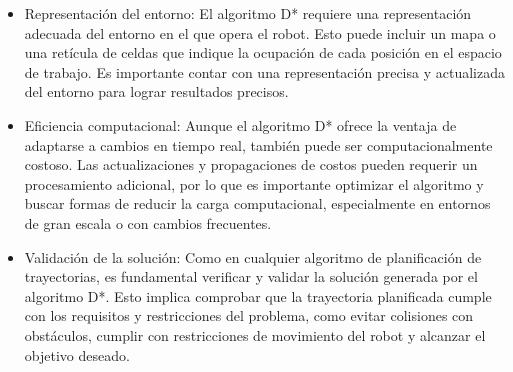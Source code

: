 \documentclass{article}
\begin{document}
\begin{itemize}
  \begin{itemize}
  \item Representación del entorno: El algoritmo D* requiere una representación adecuada del entorno en el que opera el robot. Esto puede incluir un mapa o una retícula de celdas que indique la ocupación de cada posición en el espacio de trabajo. Es importante contar con una representación precisa y actualizada del entorno para lograr resultados precisos.
  \item Eficiencia computacional: Aunque el algoritmo D* ofrece la ventaja de adaptarse a cambios en tiempo real, también puede ser computacionalmente costoso. Las actualizaciones y propagaciones de costos pueden requerir un procesamiento adicional, por lo que es importante optimizar el algoritmo y buscar formas de reducir la carga computacional, especialmente en entornos de gran escala o con cambios frecuentes.
    
  \item Validación de la solución: Como en cualquier algoritmo de planificación de trayectorias, es fundamental verificar y validar la solución generada por el algoritmo D*. Esto implica comprobar que la trayectoria planificada cumple con los requisitos y restricciones del problema, como evitar colisiones con obstáculos, cumplir con restricciones de movimiento del robot y alcanzar el objetivo deseado.
  \end{itemize}
  
\end{itemize}
\end{document}

